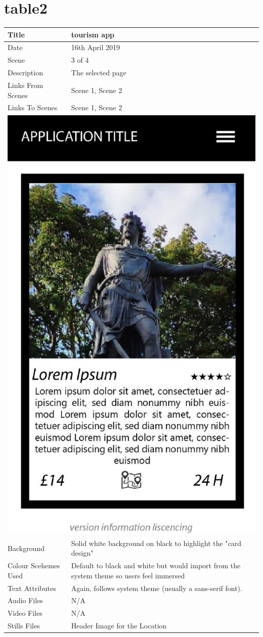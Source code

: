 \section{table2}
\hspace{-1cm}
	\centering
	\begin{tabular}{p{4cm}p{10cm}}
		\hline
		Title & tourism app \\
		\hline
		Date & 16th April 2019 \\
		\hline
		Scene & 3 of 4 \\
		\hline
		Description & The selected page \\
		\hline
		Links From Scenes & Scene 1, Scene 2 \\
		\hline
		Links To Scenes & Scene 1, Scene 2 \\
		\hline
		\multicolumn{2}{c}{\includegraphics[width=0.5\linewidth]{images/screen2.jpg}} \\
		\hline
		Background & Solid white background on black to highlight the "card design" \\
		\hline
		Colour Scehemes Used & Default to black and white but would import from the system theme so users feel immersed \\
		\hline
		Text Attributes & Again, follows system theme (usually a sans-serif font). \\
		\hline
		Audio Files & N/A \\
		\hline
		Video Files & N/A \\
		\hline
		Stills Files & Header Image for the Location \\

\end{tabular}
